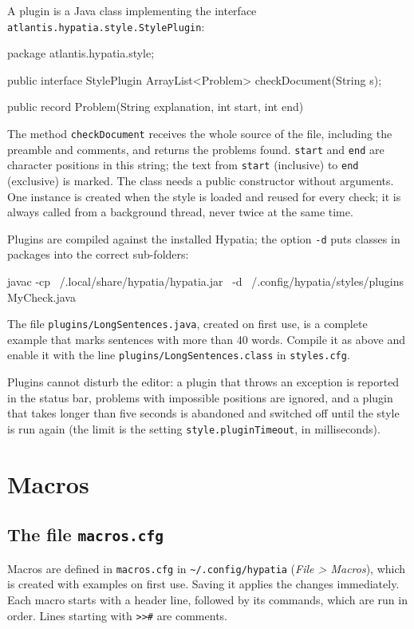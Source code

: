\documentclass[11pt]{article}
\newcommand{\menu}[1]{\textsf{\textit{#1}}}
\newcommand{\file}[1]{\texttt{#1}}
\newcommand{\cfgdir}{\texttt{\textasciitilde/.config/hypatia}}
\begin{document}
    A plugin is a Java class implementing the interface \verb+atlantis.hypatia.style.StylePlugin+:
    \begin{Code}
package atlantis.hypatia.style;

public interface StylePlugin {
    ArrayList<Problem> checkDocument(String s);
}

public record Problem(String explanation, int start, int end) {}
    \end{Code}
    The method \verb+checkDocument+ receives the whole source of the file, including the preamble and comments, and returns the problems found. \verb+start+ and \verb+end+ are character positions in this string; the text from \verb+start+ (inclusive) to \verb+end+ (exclusive) is marked. The class needs a public constructor without arguments. One instance is created when the style is loaded and reused for every check; it is always called from a background thread, never twice at the same time.

    Plugins are compiled against the installed Hypatia; the option \verb+-d+ puts classes in packages into the correct sub-folders:
    \begin{Code}
javac -cp ~/.local/share/hypatia/hypatia.jar \
      -d ~/.config/hypatia/styles/plugins MyCheck.java
    \end{Code}
    The file \file{plugins/LongSentences.java}, created on first use, is a complete example that marks sentences with more than 40 words. Compile it as above and enable it with the line \verb+plugins/LongSentences.class+ in \file{styles.cfg}.

    Plugins cannot disturb the editor: a plugin that throws an exception is reported in the status bar, problems with impossible positions are ignored, and a plugin that takes longer than five seconds is abandoned and switched off until the style is run again (the limit is the setting \verb+style.pluginTimeout+, in milliseconds).


    \section{Macros}\label{sec:macros}

    \subsection{The file \file{macros.cfg}}

    Macros are defined in \file{macros.cfg} in \cfgdir{} (\menu{File > Macros}), which is created with examples on first use. Saving it applies the changes immediately. Each macro starts with a header line, followed by its commands, which are run in order. Lines starting with \verb+>>#+ are comments.
\end{document}

